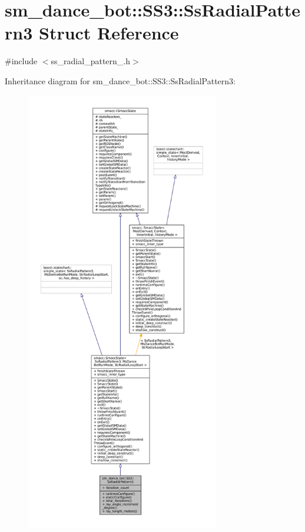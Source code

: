 \hypertarget{structsm__dance__bot_1_1SS3_1_1SsRadialPattern3}{}\section{sm\+\_\+dance\+\_\+bot\+:\+:S\+S3\+:\+:Ss\+Radial\+Pattern3 Struct Reference}
\label{structsm__dance__bot_1_1SS3_1_1SsRadialPattern3}


{\ttfamily \#include $<$ss\+\_\+radial\+\_\+pattern\+\_.\+h$>$}



Inheritance diagram for sm\+\_\+dance\+\_\+bot\+:\+:S\+S3\+:\+:Ss\+Radial\+Pattern3\+:
\nopagebreak
\begin{figure}[H]
\begin{center}
\leavevmode
\includegraphics[height=550pt]{structsm__dance__bot_1_1SS3_1_1SsRadialPattern3__inherit__graph}
\end{center}
\end{figure}



